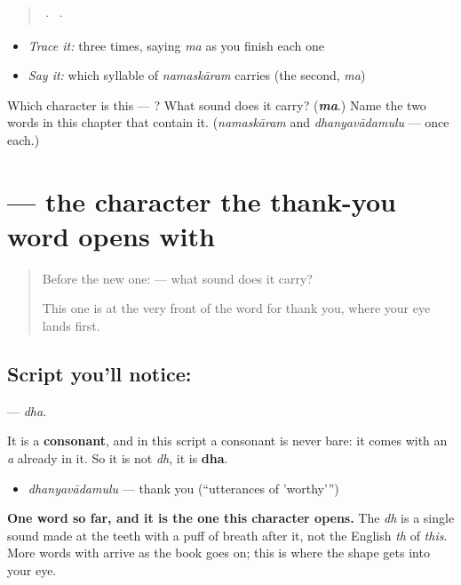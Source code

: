 \begin{quote}
  ·    ·  
\end{quote}

\begin{itemize}
\raggedright
  \item \emph{Trace it:}  three times, saying \emph{ma} as you finish each one
  \item \emph{Say it:} which syllable of \emph{namaskāram}  carries (the second, \emph{ma})
\end{itemize}

\begin{tcolorbox}[breakable,colback=teal!4,colframe=teal!35!black,title={Before you move on}]
Which character is this — ? What sound does it carry? (\emph{\textbf{ma}}.) Name the two words in this chapter that contain it. (\emph{namaskāram} and \emph{dhanyavādamulu} — once each.)
\end{tcolorbox}
\section[\texorpdfstring{\te{ధ} (dha)}{ధ (dha)}]{ — the character the thank-you word opens with}

\label{lesson:TE-S151-letter-dha}



\begin{quote}
Before the new one:  — what sound does it carry?

This one is at the very front of the word for thank you, where your eye lands first.
\end{quote}

\subsection*{Script you'll notice: }
\textbf{} — \emph{dha}.

It is a \textbf{consonant}, and in this script a consonant is never bare: it comes with an \emph{a} already in it. So it is not \emph{dh}, it is \textbf{dha}.

\begin{itemize}
\raggedright
  \item \emph{dhanyavādamulu} — thank you (\textquotedblleft{}utterances of 'worthy'\textquotedblright{})
\end{itemize}

\textbf{One word so far, and it is the one this character opens.} The \emph{dh} is a single sound made at the teeth with a puff of breath after it, not the English \emph{th} of \emph{this}. More words with  arrive as the book goes on; this is where the shape gets into your eye.

